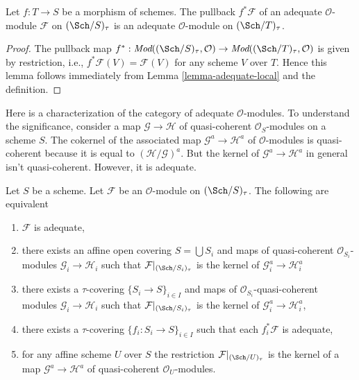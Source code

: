 \begin{lemma}
\label{lemma-pullback-adequate}
Let $f : T \to S$ be a morphism of schemes.
The pullback $f^*\mathcal{F}$ of an adequate $\mathcal{O}$-module
$\mathcal{F}$ on $(\Sch/S)_\tau$ is an adequate
$\mathcal{O}$-module on $(\Sch/T)_\tau$.
\end{lemma}

\begin{proof}
The pullback map
$f^* : \textit{Mod}((\Sch/S)_\tau, \mathcal{O}) \to
\textit{Mod}((\Sch/T)_\tau, \mathcal{O})$
is given by restriction, i.e., $f^*\mathcal{F}(V) = \mathcal{F}(V)$
for any scheme $V$ over $T$. Hence this lemma follows immediately from
Lemma \ref{lemma-adequate-local}
and the definition.
\end{proof}

\noindent
Here is a characterization of the category of adequate $\mathcal{O}$-modules.
To understand the significance, consider a map $\mathcal{G} \to \mathcal{H}$
of quasi-coherent $\mathcal{O}_S$-modules on a scheme $S$.
The cokernel of the associated map $\mathcal{G}^a \to \mathcal{H}^a$
of $\mathcal{O}$-modules is quasi-coherent because it is equal to
$(\mathcal{H}/\mathcal{G})^a$. But the kernel of
$\mathcal{G}^a \to \mathcal{H}^a$ in general isn't
quasi-coherent. However, it is adequate.

\begin{lemma}
\label{lemma-adequate-characterize}
Let $S$ be a scheme. Let $\mathcal{F}$ be an $\mathcal{O}$-module on
$(\Sch/S)_\tau$. The following are equivalent
\begin{enumerate}
\item $\mathcal{F}$ is adequate,
\item there exists an affine open covering $S = \bigcup S_i$ and
maps of quasi-coherent $\mathcal{O}_{S_i}$-modules
$\mathcal{G}_i \to \mathcal{H}_i$
such that $\mathcal{F}|_{(\Sch/S_i)_\tau}$ is the
kernel of $\mathcal{G}_i^a \to \mathcal{H}_i^a$
\item there exists a $\tau$-covering $\{S_i \to S\}_{i \in I}$ and
maps of $\mathcal{O}_{S_i}$-quasi-coherent modules
$\mathcal{G}_i \to \mathcal{H}_i$
such that $\mathcal{F}|_{(\Sch/S_i)_\tau}$ is the
kernel of $\mathcal{G}_i^a \to \mathcal{H}_i^a$,
\item there exists a $\tau$-covering $\{f_i : S_i \to S\}_{i \in I}$
such that each $f_i^*\mathcal{F}$ is adequate,
\item for any affine scheme $U$ over $S$ the restriction
$\mathcal{F}|_{(\Sch/U)_\tau}$ is the kernel
of a map $\mathcal{G}^a \to \mathcal{H}^a$ of quasi-coherent
$\mathcal{O}_U$-modules.
\end{enumerate}
\end{lemma}

